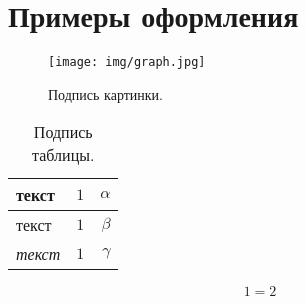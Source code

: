 \section{Примеры оформления}

\begin{figure}[h]
    \centering
    \texttt{[image: img/graph.jpg]}
    \caption{Подпись картинки.}
    \label{fig:example fig 1}
\end{figure}

\begin{table}[h]
    \centering
    \caption{Подпись таблицы.}
    \begin{tabular}{lc|r}
        \textbf{текст} & $1$ & $\alpha$ \\
        \hline
        текст & $1$ & $\beta$ \\
        \textit{текст} & $1$ & $\gamma$ \\
    \end{tabular}
    \label{fig:example table 1}
\end{table}

\begin{equation}
    1 = 2
\end{equation}